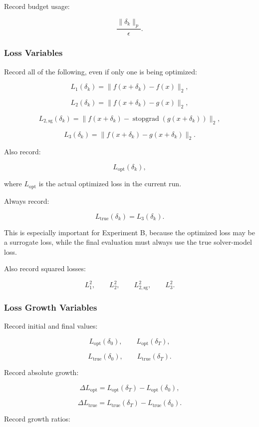 \documentclass{article}
\begin{document}
Record budget usage:

\[
\frac{\|\delta_k\|_p}{\epsilon}.
\]

\subsubsection{Loss Variables}

Record all of the following, even if only one is being optimized:

\[
L_1(\delta_k)
=
\|f(x+\delta_k)-f(x)\|_2,
\]

\[
L_2(\delta_k)
=
\|f(x+\delta_k)-g(x)\|_2,
\]

\[
L_{2,\mathrm{sg}}(\delta_k)
=
\|f(x+\delta_k)-\operatorname{stopgrad}(g(x+\delta_k))\|_2,
\]

\[
L_3(\delta_k)
=
\|f(x+\delta_k)-g(x+\delta_k)\|_2.
\]

Also record:

\[
L_{\mathrm{opt}}(\delta_k),
\]

where \(L_{\mathrm{opt}}\) is the actual optimized loss in the current run.

Always record:

\[
L_{\mathrm{true}}(\delta_k)
=
L_3(\delta_k).
\]

This is especially important for Experiment B, because the optimized loss may be a surrogate loss, while the final evaluation must always use the true solver-model loss.

Also record squared losses:

\[
L_1^2,
\qquad
L_2^2,
\qquad
L_{2,\mathrm{sg}}^2,
\qquad
L_3^2.
\]

\subsubsection{Loss Growth Variables}

Record initial and final values:

\[
L_{\mathrm{opt}}(\delta_0),
\qquad
L_{\mathrm{opt}}(\delta_T),
\]

\[
L_{\mathrm{true}}(\delta_0),
\qquad
L_{\mathrm{true}}(\delta_T).
\]

Record absolute growth:

\[
\Delta L_{\mathrm{opt}}
=
L_{\mathrm{opt}}(\delta_T)
-
L_{\mathrm{opt}}(\delta_0),
\]

\[
\Delta L_{\mathrm{true}}
=
L_{\mathrm{true}}(\delta_T)
-
L_{\mathrm{true}}(\delta_0).
\]

Record growth ratios:
\end{document}
